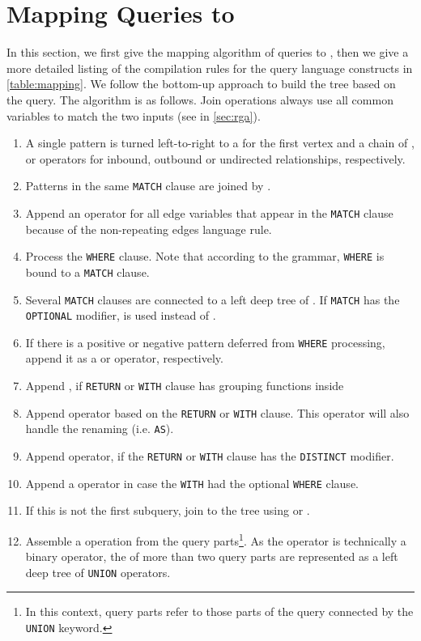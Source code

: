 \section{Mapping \opencypher Queries to \RGA}
\label{sec:compilation}

In this section, we first give the mapping algorithm of \opencypher queries to \rga, then we give a more detailed listing of the compilation rules for the query language constructs in \cref{table:mapping}.
We follow the bottom-up approach to build the \rga tree based on the \opencypher query. The algorithm is as follows. Join operations always use all common variables to match the two inputs (see \jointext in \cref{sec:rga}).

\setlength\tabcolsep{3.6pt}
\begin{enumerate}
\label{alg:build-rga-tree}
	\item A single pattern is turned left-to-right to a \getverticestext for the first vertex and a chain of \expandintext, \expandouttext or \expandbothtext operators for inbound, outbound or undirected relationships, respectively.
	\item Patterns in the same \lstinline+MATCH+ clause are joined by \jointext.
	\item Append an \alldifferenttext operator for all edge variables that appear in the \lstinline+MATCH+ clause because of the non-repeating edges language rule.
	\item Process the \lstinline+WHERE+ clause. Note that according to the grammar, \lstinline+WHERE+ is bound to a \lstinline+MATCH+ clause.
	\item Several \lstinline+MATCH+ clauses are connected to a left deep tree of \jointext. If \lstinline+MATCH+ has the \lstinline+OPTIONAL+ modifier, \leftouterjointext is used instead of \jointext.
	\item If there is a positive or negative pattern deferred from \lstinline+WHERE+ processing,
		append it as a \jointext or \antijointext operator, respectively.
	\item Append \groupingtext, if \lstinline+RETURN+ or \lstinline+WITH+ clause has grouping functions inside
	\item Append \projectiontext operator based on the \lstinline+RETURN+ or \lstinline+WITH+ clause. This operator will also handle the renaming (i.e. \lstinline+AS+).
	\item Append \duplicateeliminationtext operator, if the \lstinline+RETURN+ or \lstinline+WITH+ clause has the \lstinline+DISTINCT+ modifier.
	\item Append a \selectiontext operator in case the \lstinline+WITH+ had the optional \lstinline+WHERE+ clause.
	\item If this is not the first subquery, join to the \rga tree using \jointext or \leftouterjointext.
	\item Assemble a \uniontext operation from the query parts\footnote{In this context, query parts refer to those parts of the query connected by the \lstinline+UNION+ \opencypher keyword.}. As the \uniontext operator is technically a binary operator, the \uniontext of more than two query parts are represented as a left deep tree of \lstinline+UNION+ operators.
\end{enumerate}

